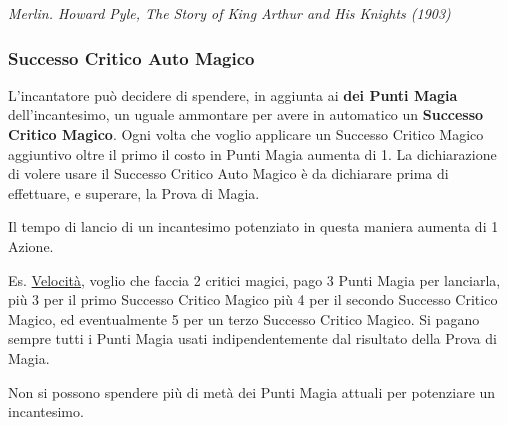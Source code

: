 \begin{multicols}{2}
\begin{center}
\emph{Merlin. Howard Pyle, The Story of King Arthur and His Knights (1903)}
\end{center}

\subsubsection{Successo Critico Auto Magico}\label{magienova}

L'incantatore può decidere di spendere, in aggiunta ai \textbf{dei Punti Magia} dell'incantesimo, un uguale ammontare per avere in automatico un \textbf{Successo Critico Magico}.
Ogni volta che voglio applicare un Successo Critico Magico aggiuntivo oltre il primo il costo in Punti Magia aumenta di 1. La dichiarazione di volere usare il Successo Critico Auto Magico è da dichiarare prima di effettuare, e superare, la Prova di Magia.

Il tempo di lancio di un incantesimo potenziato in questa maniera aumenta di 1 Azione.

Es. \hyperlink{Velocità}{Velocità}, voglio che faccia 2 critici magici, pago 3 Punti Magia per lanciarla, più 3 per il primo Successo Critico Magico più 4 per il secondo Successo Critico Magico, ed eventualmente 5 per un terzo Successo Critico Magico. Si pagano sempre tutti i Punti Magia usati indipendentemente dal risultato della Prova di Magia.

Non si possono spendere più di metà dei Punti Magia attuali per potenziare un incantesimo.




\end{multicols}
